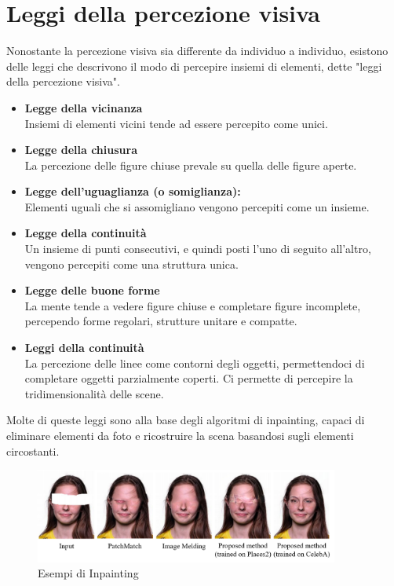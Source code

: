 \documentclass{report}
\begin{document}
\section{Leggi della percezione visiva}
Nonostante la percezione visiva sia differente da individuo a individuo, esistono delle leggi che descrivono il modo di percepire insiemi di elementi, dette "leggi della percezione visiva".
\begin{itemize}
	\item \textbf{Legge della vicinanza}\\
	      Insiemi di elementi vicini tende ad essere percepito come unici.
	\item \textbf{Legge della chiusura}\\
	      La percezione delle figure chiuse prevale su quella delle figure aperte.
	\item \textbf{Legge dell'uguaglianza (o somiglianza):}\\
	      Elementi uguali che si assomigliano vengono percepiti come un insieme.
	\item \textbf{Legge della continuità}\\
	      Un insieme di punti consecutivi, e quindi posti l'uno di seguito all'altro, vengono percepiti come una struttura unica.
	\item \textbf{Legge delle buone forme}\\
	      La mente tende a vedere figure chiuse e completare figure incomplete, percependo forme regolari, strutture unitare e compatte.
	\item \textbf{Leggi della continuità}\\
	      La percezione delle linee come contorni degli oggetti, permettendoci di completare oggetti parzialmente coperti. Ci permette di percepire la tridimensionalità delle scene.
\end{itemize}

Molte di queste leggi sono alla base degli algoritmi di inpainting, capaci di eliminare elementi da foto e ricostruire la scena basandosi sugli elementi circostanti.
\begin{figure}[htp]
	\centering
	\includegraphics[width=10cm]{pic1.png}
	\caption{Esempi di Inpainting}
\end{figure}
\newpage
\end{document}
